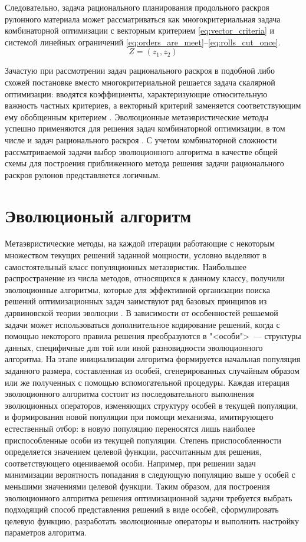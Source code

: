 \documentclass[12pt]{article}
\begin{document}
Следовательно, задача рационального планирования продольного раскроя рулонного 
материала может рассматриваться как многокритериальная задача комбинаторной 
оптимизации с векторным критерием 
\eqref{eq:vector_criteria} 
и системой линейных ограничений 
\eqref{eq:orders_are_meet}--\eqref{eq:rolls_cut_once}.
\begin{equation}\label{eq:vector_criteria}
    Z=(z_1,z_2)
\end{equation}

Зачастую при рассмотрении задач рационального раскроя в подобной либо схожей 
постановке вместо многокритериальной решается задача скалярной оптимизации: 
вводятся коэффициенты, характеризующие относительную важность частных 
критериев, а векторный критерий заменяется соответствующим ему обобщенным 
критерием 
\cite{bib:haessler88, bib:song06, bib:schilling02}. 
Эволюционные метаэвристические методы успешно 
применяются для решения задач комбинаторной оптимизации, в том числе и задач 
рационального раскроя 
\cite{bib:golfeto09}. 
С учетом комбинаторной сложности рассматриваемой 
задачи выбор эволюционного алгоритма в качестве общей схемы для построения 
приближенного метода решения задачи рационального раскроя рулонов 
представляется логичным.


\section{Эволюционый алгоритм}

Метаэвристические методы, на каждой итерации работающие с некоторым множеством 
текущих решений заданной мощности, условно выделяют в 
самостоятельный класс популяционных метаэвристик. Наибольшее распространение 
из числа методов, относящихся к данному классу, получили эволюционные 
алгоритмы, которые для эффективной организации поиска решений оптимизационных 
задач заимствуют ряд базовых принципов из дарвиновской теории эволюции 
\cite{bib:skobtsov08}. 
В зависимости от особенностей 
решаемой задачи может использоваться дополнительное кодирование решений, когда 
с помощью некоторого правила решения преобразуются в "<особи">~--- структуры 
данных, специфичные для той или иной разновидности эволюционного алгоритма. 
На этапе инициализации алгоритма формируется начальная популяция заданного 
размера, составленная из особей, сгенерированных случайным образом или же 
полученных с помощью вспомогательной процедуры. Каждая итерация эволюционного 
алгоритма состоит из последовательного выполнения эволюционных операторов, 
изменяющих структуру особей в текущей популяции, и формирования новой популяции 
при помощи механизма, имитирующего естественный отбор: в новую популяцию 
переносятся лишь наиболее приспособленные особи из текущей популяции. Степень 
приспособленности определяется значением целевой функции, рассчитанным для 
решения, соответствующего оцениваемой особи. Например, при решении задач 
минимизации вероятность попадания в следующую популяцию выше у особей с 
меньшими значениями целевой функции. Таким образом, для построения 
эволюционного алгоритма решения оптимизационной задачи требуется выбрать 
подходящий способ представления решений в виде особей, сформулировать целевую 
функцию, разработать эволюционные операторы и выполнить настройку параметров 
алгоритма.
\end{document}
